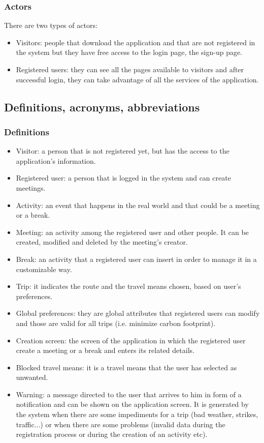 \documentclass[12pt,titlepage]{article}
\begin{document}
\subsubsection{Actors}\label{RASD}
There are two types of actors:
\begin{itemize}
\item Visitors: people that download the application and that are not registered in the system but they have free access to the login page, the sign-up page.
\item Registered users: they can see all the pages available to visitors and after successful login, they can take advantage of all the services of the application.

\end{itemize}


\subsection{Definitions, acronyms, abbreviations}\label{RASD}
\subsubsection{Definitions}\label{RASD}
\begin{itemize}
\item Visitor: a person that is not registered yet, but has the access to the application's information. 
\item	Registered user: a person that is logged in the system and can create meetings.
\item	Activity: an event that happens in the real world and that could be a meeting or a break.
\item	Meeting: an activity among the registered user and other people. It can be created, modified and deleted by the meeting's creator. 
\item	Break: an activity that a registered user can insert in order to manage it in a customizable way.
\item Trip: it indicates the route and the travel means chosen, based on user's preferences.
\item Global preferences: they are global attributes that registered users can modify and those are valid for all trips (i.e. minimize carbon footprint).
\item	Creation screen: the screen of the application in which the registered user create a meeting or a break and enters its related details.
\item Blocked travel means: it is a travel means that the user has selected as unwanted.
\item Warning: a message directed to the user that arrives to him in form of a notification and can be shown on the application screen. It is generated by the system when there are some impediments for a trip (bad weather, strikes, traffic...) or when there are some problems (invalid data during the registration process or during the creation of an activity etc).
\end{itemize}
\end{document}
